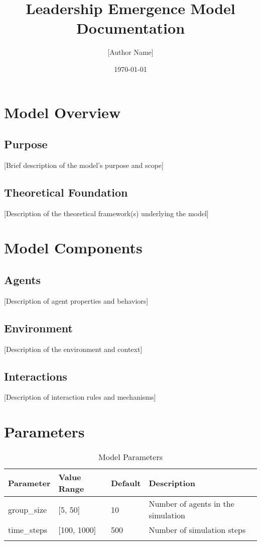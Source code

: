 \documentclass[12pt]{article}
\title{Leadership Emergence Model Documentation}
\author{[Author Name]}
\date{\today}
\begin{document}
\maketitle
\tableofcontents
\newpage

\section{Model Overview}
\subsection{Purpose}
[Brief description of the model's purpose and scope]

\subsection{Theoretical Foundation}
[Description of the theoretical framework(s) underlying the model]

\section{Model Components}
\subsection{Agents}
[Description of agent properties and behaviors]

\subsection{Environment}
[Description of the environment and context]

\subsection{Interactions}
[Description of interaction rules and mechanisms]

\section{Parameters}
\begin{table}[H]
\centering
\caption{Model Parameters}
\begin{tabular}{lllp{5cm}}
\toprule
Parameter & Value Range & Default & Description \\
\midrule
group\_size & [5, 50] & 10 & Number of agents in the simulation \\
time\_steps & [100, 1000] & 500 & Number of simulation steps \\
[Additional parameters...] & & & \\
\bottomrule
\end{tabular}
\end{table}
\end{document}
